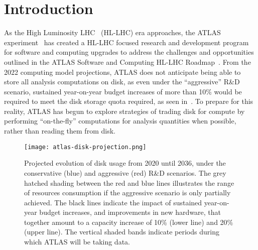 \section{Introduction}\label{sec:introduction}

As the High Luminosity LHC~\cite{ZurbanoFernandez:2020cco} (HL-LHC) era approaches, the ATLAS experiment~\cite{PERF-2007-01} has created a HL-LHC focused research and development program~\cite{ATLAS:2020pnm} for software and computing upgrades to address the challenges and opportunities outlined in the ATLAS Software and Computing HL-LHC Roadmap~\cite{CERN-LHCC-2022-005}.
From the 2022 computing model projections, ATLAS does not anticipate being able to store all analysis computations on disk, as even under the ``aggressive'' R\&D scenario, sustained year-on-year budget increases of more than 10\% would be required to meet the disk storage quota required, as seen in~.
To prepare for this reality, ATLAS has begun to explore strategies of trading disk for compute by performing ``on-the-fly'' computations for analysis quantities when possible, rather than reading them from disk.

\begin{figure}
    \centering
    \texttt{[image: atlas-disk-projection.png]}
    \caption{Projected evolution of disk usage from 2020 until 2036, under the conservative (blue) and aggressive (red) R\&D scenarios.
The grey hatched shading between the red and blue lines illustrates the range of resources consumption if the aggressive scenario is only partially achieved.
The black lines indicate the impact of sustained year-on-year budget increases, and improvements in new hardware, that together amount to a capacity increase of 10\% (lower line) and 20\% (upper line).
The vertical shaded bands indicate periods during which ATLAS will be taking data.~\cite{CERN-LHCC-2022-005}}
    \label{fig:atlas-disk-projection}
\end{figure}
